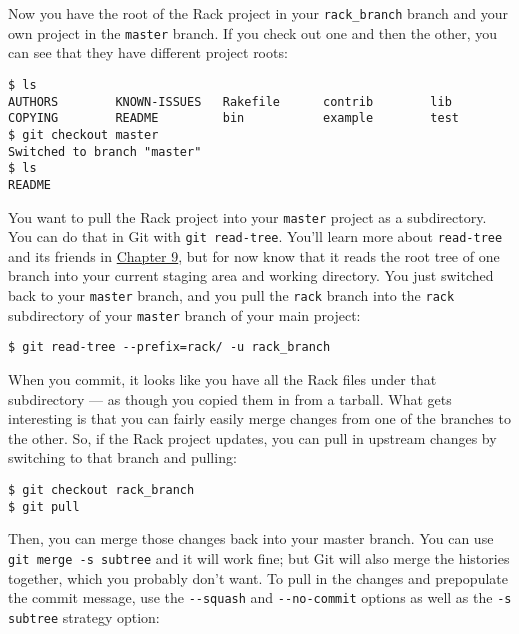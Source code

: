 \documentclass[a4paper]{book}
\newcommand{\prechap}{Chapter }
\newcommand{\postchap}{}
\newcommand{\chapref}[1]{\hyperref[chap:#1]{\prechap #1\postchap}}
\begin{document}
Now you have the root of the Rack project in your \texttt{rack\_branch} branch and your own project in the \texttt{master} branch. If you check out one and then the other, you can see that they have different project roots:

\begin{shaded}\begin{verbatim}
$ ls
AUTHORS	       KNOWN-ISSUES   Rakefile      contrib	       lib
COPYING	       README         bin           example	       test
$ git checkout master
Switched to branch "master"
$ ls
README
\end{verbatim}\end{shaded}

You want to pull the Rack project into your \texttt{master} project as a subdirectory. You can do that in Git with \texttt{git read-tree}. You'll learn more about \texttt{read-tree} and its friends in \chapref{9}, but for now know that it reads the root tree of one branch into your current staging area and working directory. You just switched back to your \texttt{master} branch, and you pull the \texttt{rack} branch into the \texttt{rack} subdirectory of your \texttt{master} branch of your main project:

\begin{shaded}\begin{verbatim}
$ git read-tree --prefix=rack/ -u rack_branch
\end{verbatim}\end{shaded}

When you commit, it looks like you have all the Rack files under that subdirectory --- as though you copied them in from a tarball. What gets interesting is that you can fairly easily merge changes from one of the branches to the other. So, if the Rack project updates, you can pull in upstream changes by switching to that branch and pulling:

\begin{shaded}\begin{verbatim}
$ git checkout rack_branch
$ git pull
\end{verbatim}\end{shaded}

Then, you can merge those changes back into your master branch. You can use \texttt{git merge -s subtree} and it will work fine; but Git will also merge the histories together, which you probably don't want. To pull in the changes and prepopulate the commit message, use the \texttt{-{}-squash} and \texttt{-{}-no-commit} options as well as the \texttt{-s subtree} strategy option:
\end{document}
